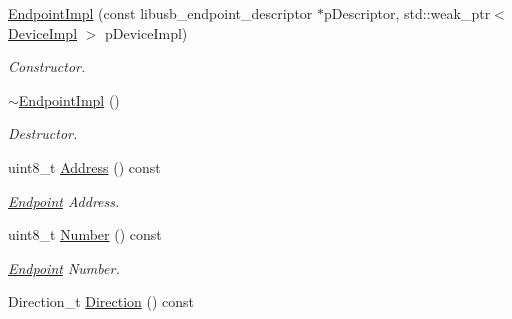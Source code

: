 \begin{DoxyCompactItemize}
\item 
\hypertarget{class_lib_u_s_b_1_1_endpoint_impl_a18f0c43e2d9385804f82f7de867ec45f}{\hyperlink{class_lib_u_s_b_1_1_endpoint_impl_a18f0c43e2d9385804f82f7de867ec45f}{Endpoint\-Impl} (const libusb\-\_\-endpoint\-\_\-descriptor $\ast$p\-Descriptor, std\-::weak\-\_\-ptr$<$ \hyperlink{class_lib_u_s_b_1_1_device_impl}{Device\-Impl} $>$ p\-Device\-Impl)}\label{class_lib_u_s_b_1_1_endpoint_impl_a18f0c43e2d9385804f82f7de867ec45f}

\begin{DoxyCompactList}\small\item\em Constructor. \end{DoxyCompactList}\item 
\hypertarget{class_lib_u_s_b_1_1_endpoint_impl_a0add9cab57d0e009d457edd1d984911c}{\hyperlink{class_lib_u_s_b_1_1_endpoint_impl_a0add9cab57d0e009d457edd1d984911c}{$\sim$\-Endpoint\-Impl} ()}\label{class_lib_u_s_b_1_1_endpoint_impl_a0add9cab57d0e009d457edd1d984911c}

\begin{DoxyCompactList}\small\item\em Destructor. \end{DoxyCompactList}\item 
\hypertarget{class_lib_u_s_b_1_1_endpoint_impl_acc217472d5fc80deb78cc1ed4130f236}{uint8\-\_\-t \hyperlink{class_lib_u_s_b_1_1_endpoint_impl_acc217472d5fc80deb78cc1ed4130f236}{Address} () const }\label{class_lib_u_s_b_1_1_endpoint_impl_acc217472d5fc80deb78cc1ed4130f236}

\begin{DoxyCompactList}\small\item\em \hyperlink{class_lib_u_s_b_1_1_endpoint}{Endpoint} Address. \end{DoxyCompactList}\item 
\hypertarget{class_lib_u_s_b_1_1_endpoint_impl_a706db0ec9bfceb11d97cc477396fac3a}{uint8\-\_\-t \hyperlink{class_lib_u_s_b_1_1_endpoint_impl_a706db0ec9bfceb11d97cc477396fac3a}{Number} () const }\label{class_lib_u_s_b_1_1_endpoint_impl_a706db0ec9bfceb11d97cc477396fac3a}

\begin{DoxyCompactList}\small\item\em \hyperlink{class_lib_u_s_b_1_1_endpoint}{Endpoint} Number. \end{DoxyCompactList}\item 
\hypertarget{class_lib_u_s_b_1_1_endpoint_impl_a58d847890186cc806c2400bb141e07c5}{Direction\-\_\-t \hyperlink{class_lib_u_s_b_1_1_endpoint_impl_a58d847890186cc806c2400bb141e07c5}{Direction} () const }\label{class_lib_u_s_b_1_1_endpoint_impl_a58d847890186cc806c2400bb141e07c5}


\end{DoxyCompactItemize}
